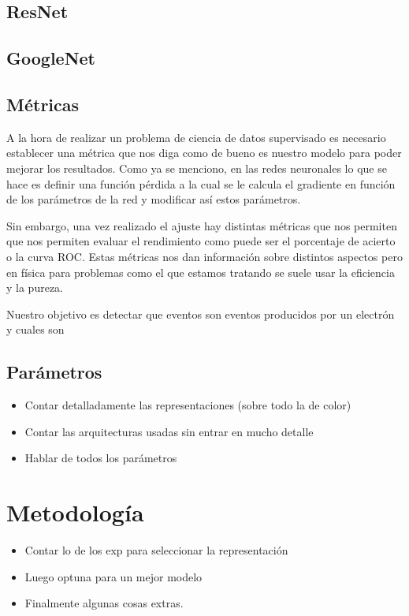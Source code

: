 \documentclass[a4paper,12pt,twoside,titlepage]{article}
\begin{document}
\subsection*{ResNet}

\subsection*{GoogleNet}

\subsection{Métricas}

A la hora de realizar un problema de ciencia de datos supervisado es necesario establecer una métrica que nos diga como de bueno es nuestro modelo para poder mejorar los resultados. Como ya se menciono, en las redes neuronales lo que se hace es definir una función pérdida a la cual se le calcula el gradiente en función de los parámetros de la red y modificar así estos parámetros.

Sin embargo, una vez realizado el ajuste hay distintas métricas que nos permiten que nos permiten evaluar el rendimiento como puede ser el porcentaje de acierto o la curva ROC. Estas métricas nos dan información sobre distintos aspectos pero en física para problemas como el que estamos tratando se suele usar la eficiencia y la pureza.

Nuestro objetivo es detectar que eventos son eventos producidos por un electrón y cuales son 

\subsection{Parámetros}

\begin{itemize}
  \item Contar detalladamente las representaciones (sobre todo la de color)
  \item Contar las arquitecturas usadas sin entrar en mucho detalle
  \item Hablar de todos los parámetros
\end{itemize}
\label{sec:arch}
\section{Metodología}
\begin{itemize}
  \item Contar lo de los exp para seleccionar la representación
  \item Luego optuna para un mejor modelo
  \item Finalmente algunas cosas extras.
\end{itemize}
\end{document}
